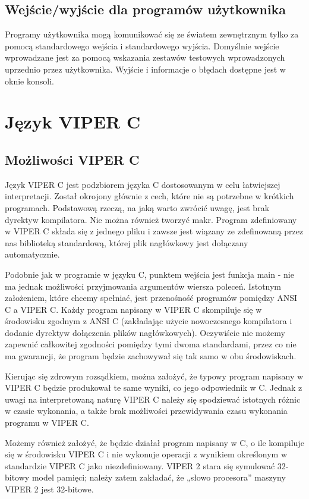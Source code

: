 \documentclass[a4paper,twoside,openright,11pt]{report}
\begin{document}
  \section {Wejście/wyjście dla programów użytkownika}
  \par Programy użytkownika mogą komunikować się ze światem zewnętrznym tylko za pomocą standardowego wejścia i standardowego wyjścia. Domyślnie wejście wprowadzane jest za pomocą wskazania zestawów testowych wprowadzonych uprzednio przez użytkownika. Wyjście i informacje o błędach dostępne jest w oknie konsoli.

  \chapter {Język VIPER C}

  \section {Możliwości VIPER C}

\par Język VIPER C jest podzbiorem języka C dostosowanym w celu łatwiejszej interpretacji. Został okrojony głównie z cech, które nie są potrzebne w krótkich programach. Podstawową rzeczą, na jaką warto zwrócić uwagę, jest brak dyrektyw kompilatora. Nie można również tworzyć makr. Program zdefiniowany w VIPER C składa się z jednego pliku i zawsze jest wiązany ze zdefinowaną przez nas biblioteką standardową, której plik nagłówkowy jest dołączany automatycznie. 
\par Podobnie jak w programie w języku C, punktem wejścia jest funkcja main - nie ma jednak możliwości przyjmowania argumentów wiersza poleceń. Istotnym założeniem, które chcemy spełniać, jest przenośność programów pomiędzy ANSI C a VIPER C. Każdy program napisany w VIPER C skompiluje się w środowisku zgodnym z ANSI C (zakładając użycie nowoczesnego kompilatora i dodanie dyrektyw dołączenia plików nagłówkowych). Oczywiście nie możemy zapewnić całkowitej zgodności pomiędzy tymi dwoma standardami, przez co nie ma gwarancji, że program będzie zachowywał się tak samo w obu środowiskach. \par Kierując się zdrowym rozsądkiem, można założyć, że typowy program napisany w VIPER C będzie produkował te same wyniki, co jego odpowiednik w C. Jednak z uwagi na interpretowaną naturę VIPER C należy się spodziewać istotnych różnic w czasie wykonania, a także brak możliwości przewidywania czasu wykonania programu w VIPER C. 
\par Możemy również założyć, że będzie działał program napisany w C, o ile kompiluje się w środowisku VIPER C i nie wykonuje operacji z wynikiem określonym w standardzie VIPER C jako niezdefiniowany. VIPER 2 stara się symulować 32-bitowy model pamięci; należy zatem zakładać, że „słowo procesora” maszyny VIPER 2 jest 32-bitowe. 
\end{document}
